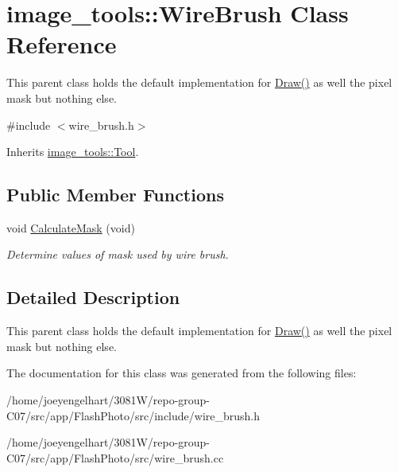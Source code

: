 \hypertarget{classimage__tools_1_1WireBrush}{}\section{image\+\_\+tools\+:\+:Wire\+Brush Class Reference}
\label{classimage__tools_1_1WireBrush}


This parent class holds the default implementation for \hyperlink{classimage__tools_1_1Tool_aa5a313769f2a2c5c83b816da81e82bd2}{Draw()} as well the pixel mask but nothing else.  




{\ttfamily \#include $<$wire\+\_\+brush.\+h$>$}



Inherits \hyperlink{classimage__tools_1_1Tool}{image\+\_\+tools\+::\+Tool}.

\subsection*{Public Member Functions}
\begin{DoxyCompactItemize}
\item 
void \hyperlink{classimage__tools_1_1WireBrush_a9d83fc270ffa16b0be4ff3bd1bd0154b}{Calculate\+Mask} (void)\hypertarget{classimage__tools_1_1WireBrush_a9d83fc270ffa16b0be4ff3bd1bd0154b}{}\label{classimage__tools_1_1WireBrush_a9d83fc270ffa16b0be4ff3bd1bd0154b}

\begin{DoxyCompactList}\small\item\em Determine values of mask used by wire brush. \end{DoxyCompactList}\end{DoxyCompactItemize}


\subsection{Detailed Description}
This parent class holds the default implementation for \hyperlink{classimage__tools_1_1Tool_aa5a313769f2a2c5c83b816da81e82bd2}{Draw()} as well the pixel mask but nothing else. 

The documentation for this class was generated from the following files\+:\begin{DoxyCompactItemize}
\item 
/home/joeyengelhart/3081\+W/repo-\/group-\/\+C07/src/app/\+Flash\+Photo/src/include/wire\+\_\+brush.\+h\item 
/home/joeyengelhart/3081\+W/repo-\/group-\/\+C07/src/app/\+Flash\+Photo/src/wire\+\_\+brush.\+cc\end{DoxyCompactItemize}
